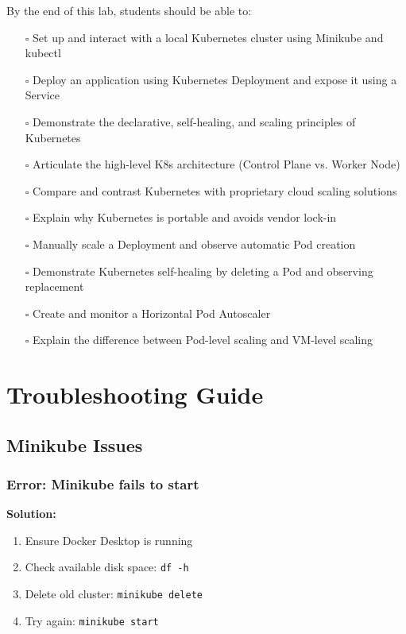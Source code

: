 \documentclass[12pt,a4paper]{article}
\begin{document}
By the end of this lab, students should be able to:

\begin{itemize}
    \item[$\square$] Set up and interact with a local Kubernetes cluster using Minikube and kubectl
    \item[$\square$] Deploy an application using Kubernetes Deployment and expose it using a Service
    \item[$\square$] Demonstrate the declarative, self-healing, and scaling principles of Kubernetes
    \item[$\square$] Articulate the high-level K8s architecture (Control Plane vs. Worker Node)
    \item[$\square$] Compare and contrast Kubernetes with proprietary cloud scaling solutions
    \item[$\square$] Explain why Kubernetes is portable and avoids vendor lock-in
    \item[$\square$] Manually scale a Deployment and observe automatic Pod creation
    \item[$\square$] Demonstrate Kubernetes self-healing by deleting a Pod and observing replacement
    \item[$\square$] Create and monitor a Horizontal Pod Autoscaler
    \item[$\square$] Explain the difference between Pod-level scaling and VM-level scaling
\end{itemize}

\newpage

\appendix

\section{Troubleshooting Guide}

\subsection{Minikube Issues}

\subsubsection{Error: Minikube fails to start}

\begin{warningbox}
\textbf{Solution:}
\begin{enumerate}
    \item Ensure Docker Desktop is running
    \item Check available disk space: \texttt{df -h}
    \item Delete old cluster: \texttt{minikube delete}
    \item Try again: \texttt{minikube start}
\end{enumerate}
\end{warningbox}
\end{document}
